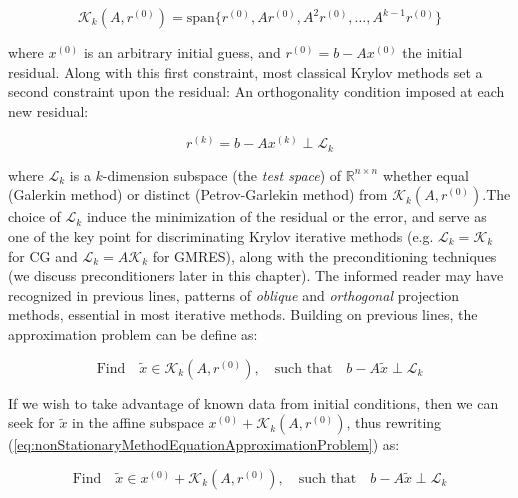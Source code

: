 \begin{equation}
     \mathcal{K}_k(A, r^{(0)}) = \text{span} \{ r^{(0)}, Ar^{(0)}, A^2r^{(0)}, \dots, A^{k-1}r^{(0)} \}
    \label{eq:nonStationaryMethodEquation}
\end{equation}

where $x^{(0)}$ is an arbitrary initial guess, and $r^{(0)} = b - Ax^{(0)}$ the initial residual. Along with this first constraint, most classical Krylov methods set a second constraint upon the residual: An orthogonality condition imposed at each new residual:

\begin{equation}
    r^{(k)} = b - Ax^{(k)} \perp \mathcal{L}_k
    \label{eq:nonStationaryMethodEquationConstraint}
\end{equation}

where $\mathcal{L}_k$ is a $k$-dimension subspace (the \textit{test space}) of $\mathbb{R}^{n \times n}$ whether equal (Galerkin method) or distinct (Petrov-Garlekin method) from $\mathcal{K}_k(A, r^{(0)})$.The choice of $\mathcal{L}_k$ induce the minimization of the residual or the error, and serve as one of the key point for discriminating Krylov iterative methods (e.g. $\mathcal{L}_k = \mathcal{K}_k$ for CG and $\mathcal{L}_k = A\mathcal{K}_k$ for GMRES), along with the preconditioning techniques (we discuss preconditioners later in this chapter). The informed reader may have recognized in previous lines, patterns of \textit{oblique} and \textit{orthogonal} projection methods, essential in most iterative methods. Building on previous lines, the approximation problem can be define as:


\begin{equation}
    \text{Find} \quad \tilde{x} \in \mathcal{K}_k(A, r^{(0)}),\quad \text{such that} \quad b - A\tilde{x} \perp \mathcal{L}_k
    \label{eq:nonStationaryMethodEquationApproximationProblem}
\end{equation}


If we wish to take advantage of known data from initial conditions, then we can seek for $\tilde{x}$ in the affine subspace $x^{(0)} + \mathcal{K}_k(A, r^{(0)})$, thus rewriting (\ref{eq:nonStationaryMethodEquationApproximationProblem}) as:

\begin{equation}
    \text{Find} \quad \tilde{x} \in x^{(0)} + \mathcal{K}_k(A, r^{(0)}),\quad \text{such that} \quad b - A\tilde{x} \perp \mathcal{L}_k
    \label{eq:nonStationaryMethodEquationApproximationProblem2}
\end{equation}


